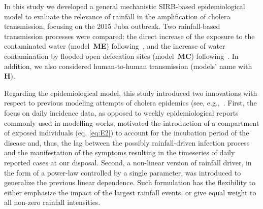 In this study we developed a general mechanistic SIRB-based epidemiological model to evaluate the relevance of rainfall in the amplification of cholera transmission, focusing on the 2015 Juba outbreak. Two rainfall-based transmission processes were compared: the direct increase of the exposure to the contaminated water (model~\textbf{ME}) following~\cite{eisenbergExaminingRainfallCholera2013}, and the increase of water contamination by flooded open defecation sites (model~\textbf{MC}) following~\cite{rinaldoReassessment201020112012}. In addition, we also considered human-to-human transmission (models' name with \textbf{H}).

Regarding the epidemiological model, this study introduced two innovations with respect to previous modeling attempts of cholera epidemics (see, e.g.,~\cite{bertuzzoProbabilityExtinctionHaiti2016,pasettoRealtimeProjectionsCholera2017}. First, the focus on daily incidence data, as opposed to weekly epidemiological reports commonly used in modelling works, motivated the introduction of a compartment of exposed individuals (eq. \ref{eq:E2}) to account for the incubation period of the disease and, thus, the lag between the possibly rainfall-driven infection process and the manifestation of the symptoms resulting in the timeseries of daily reported cases at our disposal. %
Second, a non-linear version of rainfall driver, in the form of a power-law controlled by a single parameter, was introduced to generalize the previous linear dependence. Such formulation has the flexibility to either emphasize the impact of the largest rainfall events, or give equal weight to all non-zero rainfall intensities. %

